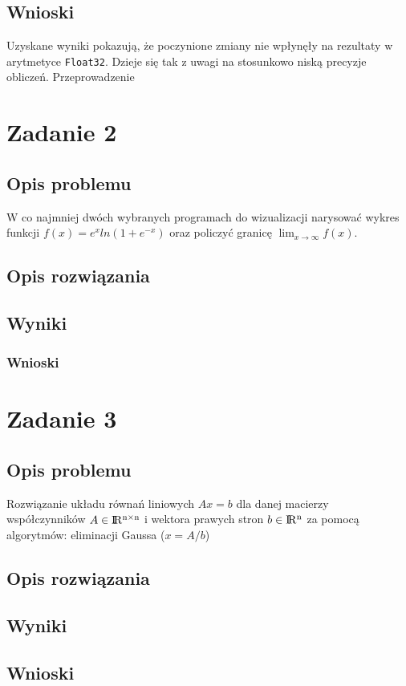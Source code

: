\documentclass{classrep}
\begin{document}
	\subsection{Wnioski}
		Uzyskane wyniki pokazują, że poczynione zmiany nie wpłynęły na rezultaty w arytmetyce \texttt{Float32}. Dzieje się tak z uwagi na stosunkowo niską precyzje obliczeń. Przeprowadzenie 
\section{Zadanie 2}
	\subsection{Opis problemu}
		W co najmniej dwóch wybranych programach do wizualizacji narysować wykres funkcji $f(x)=e^{x}ln(1+e^{-x})$ oraz policzyć granicę $\lim_{x \to \infty} f(x)$.
		
	\subsection{Opis rozwiązania}
	\subsection{Wyniki}			
	\subsubsection{Wnioski}
\section{Zadanie 3}
	\subsection{Opis problemu}
		Rozwiązanie układu równań liniowych $Ax = b$ dla danej macierzy współczynników $A 
		\in {\rm I\!R^{n \times n}}$ i wektora prawych stron $b \in {\rm I\!R^n}$ za 
		pomocą algorytmów: eliminacji Gaussa ($x=A/b$)%
	\subsection{Opis rozwiązania}
	\subsection{Wyniki}
		
	\subsection{Wnioski}
\end{document}
